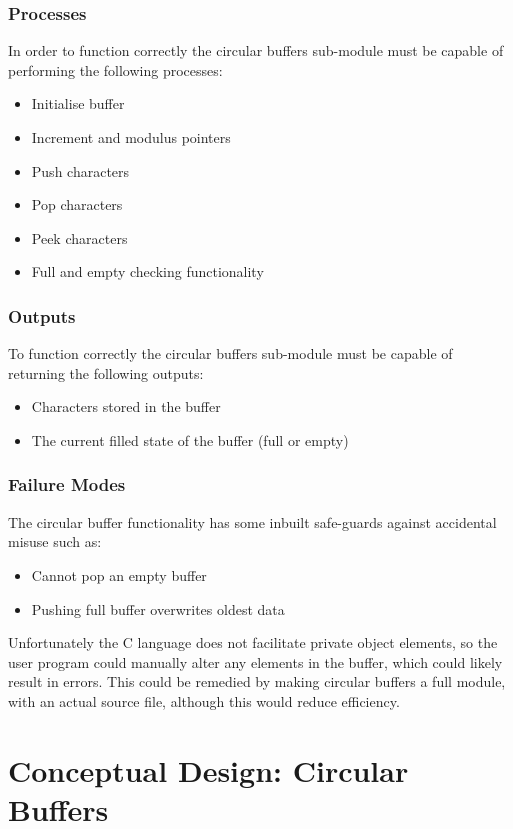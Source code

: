 \documentclass[]{report}
\begin{document}
\subsubsection{Processes}
In order to function correctly the circular buffers sub-module must be capable of performing the following processes:
\begin{itemize}
	\item Initialise buffer
	\item Increment and modulus pointers
	\item Push characters
	\item Pop characters
	\item Peek characters
	\item Full and empty checking functionality
\end{itemize}

\subsubsection{Outputs}
To function correctly the circular buffers sub-module must be capable of returning the following outputs:
\begin{itemize}
	\item Characters stored in the buffer
	\item The current filled state of the buffer (full or empty)
\end{itemize}

\subsubsection{Failure Modes}
The circular buffer functionality has some inbuilt safe-guards against accidental misuse such as:
\begin{itemize}
	\item Cannot pop an empty buffer
	\item Pushing full buffer overwrites oldest data
\end{itemize}
Unfortunately the C language does not facilitate private object elements, so the user program could manually alter any elements in the buffer, which could likely result in errors. This could be remedied by making circular buffers a full module, with an actual source file, although this would reduce efficiency.

\section{Conceptual Design: Circular Buffers}
\end{document}
